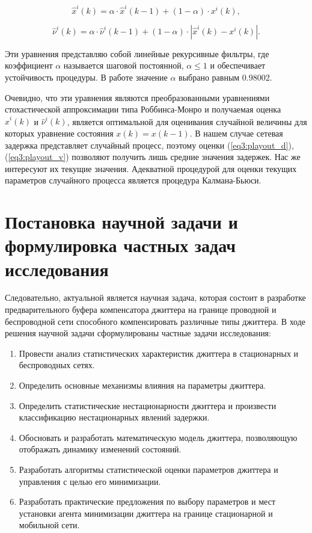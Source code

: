 \begin{equation}\label{eq3:playout_d}
\hat{x}^{i}(k)=\alpha\cdot\hat{x}^{i}(k-1)+(1-\alpha)\cdot x^{i}(k),
\end{equation}

\begin{equation}\label{eq3:playout_v}
\hat{\nu}^{i}(k)=\alpha\cdot\hat{\nu}^{i}(k-1)+(1-\alpha)\cdot | \hat{x}^{i}(k)-x^{i}(k) |.
\end{equation}

Эти уравнения представляю собой линейные рекурсивные фильтры, где коэффициент $\alpha$ называется шаговой постоянной, $\alpha\leq1$ и обеспечивает устойчивость процедуры. В работе \cite{Ramjee} значение $\alpha$ выбрано равным 0.98002. 

Очевидно, что эти уравнения являются преобразованными уравнениями стохастической аппроксимации типа Роббинса-Монро и получаемая оценка $\hat{x}^{i}(k)$ и $\hat{\nu}^{i}(k)$, является оптимальной для оценивания случайной величины для которых уравнение состояния $x(k)=x(k-1)$. 
В нашем случае сетевая задержка представляет случайный процесс, поэтому оценки (\ref{eq3:playout_d}), (\ref{eq3:playout_v}) позволяют получить лишь средние значения задержек. 
Нас же интересуют их текущие значения. Адекватной процедурой для оценки текущих параметров случайного процесса является процедура Калмана-Бьюси.




\section{Постановка научной задачи и формулировка частных задач исследования } \label{sect1_tasks}

Следовательно, актуальной является научная задача, которая состоит в разработке предварительного буфера компенсатора джиттера на границе проводной и беспроводной сети способного компенсировать различные типы джиттера.
В ходе решения научной задачи сформулированы частные задачи исследования:
\begin{enumerate}
  \item Провести анализ статистических характеристик джиттера в стационарных и беспроводных сетях.
  \item Определить основные механизмы влияния на параметры джиттера.
  \item Определить статистические нестационарности джиттера и произвести классификацию нестационарных явлений задержки.
  \item Обосновать и разработать математическую модель джиттера, позволяющую отображать динамику изменений состояний.
  \item Разработать алгоритмы статистической оценки параметров джиттера и управления с целью его минимизации.
  \item Разработать практические предложения по выбору параметров и мест установки агента минимизации джиттера на границе стационарной и мобильной сети.
\end{enumerate}


